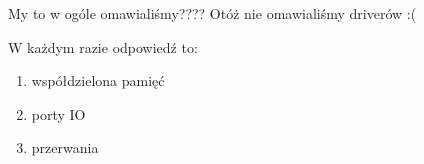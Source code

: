 My to w ogóle omawialiśmy????
Otóż nie omawialiśmy driverów :(

W każdym razie odpowiedź to:
\begin{enumerate}
	\item współdzielona pamięć
	\item porty IO
	\item przerwania
\end{enumerate}
